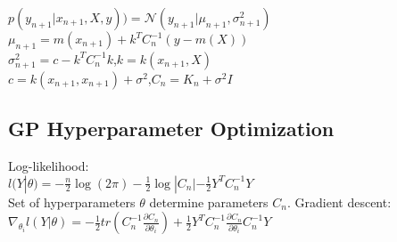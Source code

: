 $p(y_{n+1}|x_{n+1}, X, y)) = \mathcal{N}(y_{n+1} | \mu_{n+1}, \sigma^2_{n+1})$	\\
$\mu_{n+1} = m(x_{n+1})+k^T C^{-1}_n (y\!-\!m(X))$ \\
$\sigma^2_{n+1} = c - k^T C^{-1}_n k$,$k = k(x_{n+1}, X)$ \\
$c = k(x_{n+1},x_{n+1})\!+\!\sigma^2$,$C_n = K_n + \sigma^2 I$

\subsection*{GP Hyperparameter Optimization}
Log-likelihood:\\
$l(Y|\theta) = -\frac{n}{2} \log(2\pi) - \frac{1}{2} \log |C_n| - \frac{1}{2} Y^T C_n^{-1}Y$\\
Set of hyperparameters $\theta$ determine parameters $C_n$. Gradient descent: $\nabla_{\theta_i}l(Y|\theta) = -\frac{1}{2}tr(C_n^{-1} \frac{\partial C_n}{\partial \theta_i}) + \frac{1}{2} Y^T C_n^{-1} \frac{\partial C_n}{\partial \theta_i} C_n^{-1} Y$

